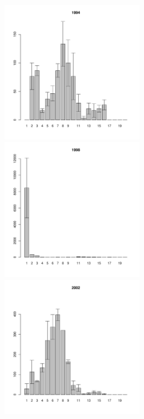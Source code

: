 \documentclass[12pt, a4paper]{article}
\begin{document}
\begin{figure}[h]
\begin{multicols}{3}
\hfill
\includegraphics[width=60mm]{../White_Sea/Estuatiy_Luvenga/sizestr_1994_.pdf}
\hfill
\includegraphics[width=60mm]{../White_Sea/Estuatiy_Luvenga/sizestr_1998_.pdf}
\hfill
\includegraphics[width=60mm]{../White_Sea/Estuatiy_Luvenga/sizestr_2002_.pdf}
\end{multicols}



\end{figure}
\end{document}
